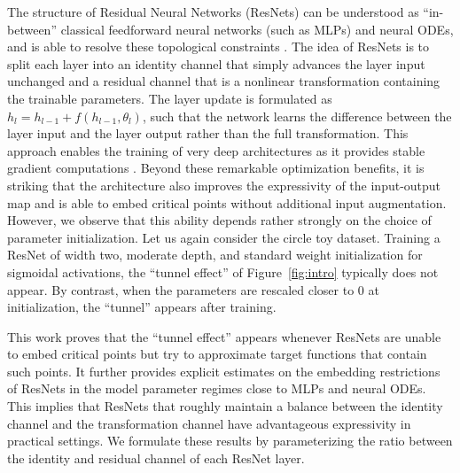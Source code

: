 \documentclass[10pt]{article}
\theoremstyle{definition}
\numberwithin{equation}{section}
\begin{document}
	
	The structure of Residual Neural Networks (ResNets) \cite{he16} can be understood as ``in-between'' classical feedforward neural networks (such as MLPs) and neural ODEs, and is able to resolve these topological constraints \cite{lj18resnet}. The idea of ResNets is to split each layer into an identity channel that simply advances the layer input unchanged and a residual channel that is a nonlinear transformation containing the trainable parameters. The layer update is formulated as $h_{l} = h_{l-1} + f(h_{l-1}, \theta_l)$, such that the network learns the difference between the layer input and the layer output rather than the full transformation. This approach enables the training of very deep architectures as it provides stable gradient computations \cite{haber2017, Weinan2017}. Beyond these remarkable optimization benefits, it is striking that the architecture also improves the expressivity of the input-output map and is able to embed critical points without additional input augmentation. However, we observe that this ability depends rather strongly on the choice of parameter initialization. Let us again consider the circle toy dataset. Training a ResNet of width two, moderate depth, and standard weight initialization for sigmoidal activations, the ``tunnel effect'' of Figure~\ref{fig:intro} typically does not appear. By contrast, when the parameters are rescaled closer to $0$ at initialization, the ``tunnel'' appears after training.

    This work proves that the ``tunnel effect'' appears whenever ResNets are unable to embed critical points but try to approximate target functions that contain such points. It further provides explicit estimates on the embedding restrictions of ResNets in the model parameter regimes close to MLPs and neural ODEs. This implies that ResNets that roughly maintain a balance between the identity channel and the transformation channel have advantageous expressivity in practical settings. We formulate these results by parameterizing the ratio between the identity and residual channel of each ResNet layer. 
\end{document}
